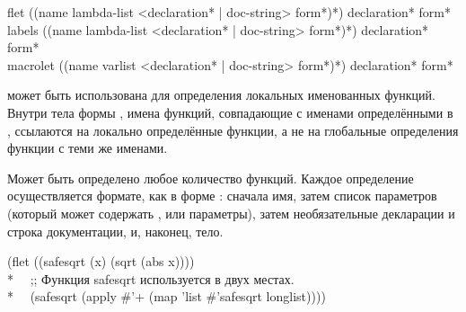 \begin{defmac}
flet ({(name lambda-list
        <{declaration}* | doc-string> {form}*)}*)
     {declaration}* {form}* \\
labels ({(name lambda-list
          <{declaration}* | doc-string> {form}*)}*)
       {declaration}* {form}* \\
macrolet ({(name varlist
            <{declaration}* | doc-string> {form}*)}*)
         {declaration}* {form}*

 может быть использована для определения локальных именованных
функций. Внутри тела формы , имена функций, совпадающие с именами
определёнными в , ссылаются на локально определённые функции, а не на
глобальные определения функции с теми же именами.

Может быть определено любое количество функций. Каждое определение
осуществляется формате, как в форме : сначала имя, затем список
параметров (который может содержать ,  или 
параметры), затем необязательные декларации и строка документации, и, наконец,
тело.
\begin{lisp}
(flet ((safesqrt (x) (sqrt (abs x)))) \\*
~~;; Функция safesqrt используется в двух местах. \\*
~~(safesqrt (apply \#'+ (map 'list \#'safesqrt longlist))))
\end{lisp}


\end{defmac}
